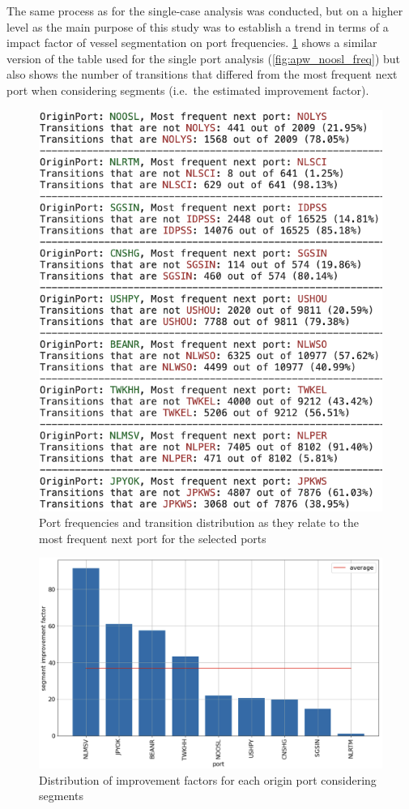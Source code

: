 The same process as for the single-case analysis was conducted, but on a higher level as the main purpose of this study was to establish a trend in terms of a impact factor of vessel segmentation on port frequencies. \cref{fig:trend_freq} shows a similar version of the table used for the single port analysis (\cref{fig:apw_noosl_freq}) but also shows the number of transitions that differed from the most frequent next port when considering segments (i.e.\ the estimated improvement factor).

\begin{figure}[htbp]
    \centering
    \includegraphics[width=.56\textwidth]{figures/apw/trend_frequency.png}
    \caption{Port frequencies and transition distribution as they relate to the most frequent next port for the selected ports}
    \label{fig:trend_freq}
\end{figure}

\begin{figure}[htbp]
    \centering
    \includegraphics[width=.9\textwidth]{figures/apw/segment_improvement.png}
    \caption{Distribution of improvement factors for each origin port considering segments}
    \label{fig:segment_improvment}
\end{figure}

